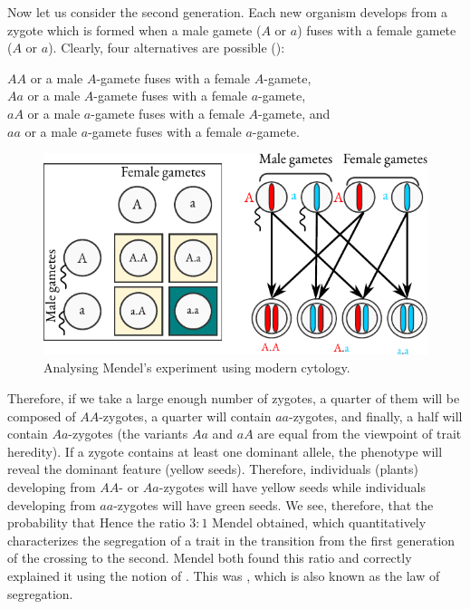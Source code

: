 Now let us consider the second generation. Each new organism
develops from a zygote which is formed when a male gamete ($A$ or $a$)
fuses with a female gamete ($A$ or $a$). Clearly, four alternatives are
possible ():
\begin{mybox}{}
 $AA$ or a male $A$-gamete fuses with a female $A$-gamete,\\
$Aa$ or a male $A$-gamete fuses with a female $a$-gamete,\\
$aA$ or a male $a$-gamete fuses with a female $A$-gamete, and\\
$aa$ or a male $a$-gamete fuses with a female $a$-gamete.
\end{mybox}


\begin{figure}[!ht]
\centering
\includegraphics[width=0.9\tfwidth]{figures/genes1.pdf}
\caption{Analysing Mendel's experiment using modern cytology.\label{genes1}}
\end{figure}

 Therefore, if we take a large enough number of zygotes, a quarter of them will be composed of
$AA$-zygotes, a quarter will contain $aa$-zygotes, and finally, a half will
contain $Aa$-zygotes (the variants $Aa$ and $aA$ are equal from the
viewpoint of trait heredity). If a zygote contains at least one dominant
allele, the phenotype will reveal the dominant feature (yellow seeds).
Therefore, individuals (plants) developing from $AA$- or $Aa$-zygotes will
have yellow seeds while individuals developing from $aa$-zygotes will have
green seeds. We see, therefore, that the probability that  Hence the ratio $3:1$ Mendel obtained,
which quantitatively characterizes the segregation of a trait in the
transition from the first generation of the crossing to the second. Mendel
both found this ratio and correctly explained it using the notion of
. This was , which is also known as the law of segregation.

